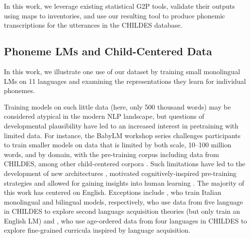 In this work, we leverage existing statistical G2P tools, validate their outputs using maps to \phoible inventories, and use our resulting tool to produce phonemic transcriptions for the utterances in the CHILDES database.

\subsection{Phoneme LMs and Child-Centered Data}\label{sec:13-babylm}


In this work, we illustrate one use of our dataset by training small monolingual LMs on 11 languages and examining the representations they learn for individual phonemes. 

Training models on such little data (here, only 500 thousand words) may be considered atypical in the modern NLP landscape, but questions of developmental plausibility have led to an increased interest in pretraining with limited data. For instance, the BabyLM workshop series challenges participants to train smaller models on data that is limited by both scale, 10--100 million words, and by domain, with the pre-training corpus including data from CHILDES, among other child-centered corpora \citep{warstadt-2023-babylm-findings, hu-etal-2024-findings}. Such limitations have led to the development of new architectures \citep{georges-gabriel-charpentier-samuel-2023-layers, charpentier2024gpt}, motivated cognitively-inspired pre-training strategies \citep{huebner-etal-2021-babyberta, martinez-etal-2023-climb} and allowed for gaining insights into human learning \citep{yedetore-etal-2023-poor}. The majority of this work has centered on English. Exceptions include \citet{capone2024babies, shen2024bambino}, who train Italian monolingual and bilingual models, respectively, \citet{yadavalli2023slabert} who use data from five language in CHILDES to explore second language acquisition theories (but only train an English LM) and \citet{salhan-etal-2024-less}, who use age-ordered data from four languages in CHILDES to explore fine-grained curricula inspired by language acquisition.

